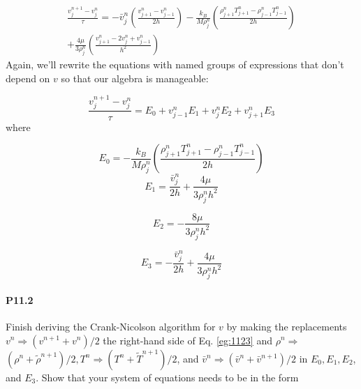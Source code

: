 \documentclass{book}
\theoremstyle{plain}
\theoremstyle{definition}
\numberwithin{exm}{chapter}
\theoremstyle{remark}
\theoremstyle{summary}
\theoremstyle{overview}
\begin{document}
\begin{equation}\label{eq:1122}
\begin{array}{r}
\frac{v_{j}^{n+1}-v_{j}^{n}}{\tau}=-\bar{v}_{j}^{n}\left(\frac{v_{j+1}^{n}-v_{j-1}^{n}}{2 h}\right)-\frac{k_{B}}{M \rho_{j}^{n}}\left(\frac{\rho_{j+1}^{n} T_{j+1}^{n}-\rho_{j-1}^{n} T_{j-1}^{n}}{2 h}\right) \\
+\frac{4 \mu}{3 \rho_{j}^{n}}\left(\frac{v_{j+1}^{n}-2 v_{j}^{n}+v_{j-1}^{n}}{h^{2}}\right)
\end{array}
\end{equation}
Again, we\rq ll rewrite the equations with named groups of expressions that don\rq t
depend on $v$ so that our algebra is manageable:


\begin{equation}\label{eq:1123}
\frac{v_{j}^{n+1}-v_{j}^{n}}{\tau}=E_{0}+v_{j-1}^{n} E_{1}+v_{j}^{n} E_{2}+v_{j+1}^{n} E_{3}
\end{equation}
where

\begin{equation}\label{eq:1124}
E_{0}=-\frac{k_{B}}{M \rho_{j}^{n}}\left(\frac{\rho_{j+1}^{n} T_{j+1}^{n}-\rho_{j-1}^{n} T_{j-1}^{n}}{2 h}\right)
\end{equation}
\begin{equation}\label{eq:1125}
E_{1}=\frac{\bar{v}_{j}^{n}}{2 h}+\frac{4 \mu}{3 \rho_{j}^{n} h^{2}}
\end{equation}

\begin{equation}\label{eq:1126}
E_{2}=-\frac{8 \mu}{3 \rho_{j}^{n} h^{2}}
\end{equation}

\begin{equation}\label{eq:1127}
E_{3}=-\frac{\bar{v}_{j}^{n}}{2 h}+\frac{4 \mu}{3 \rho_{j}^{n} h^{2}}
\end{equation}

\paragraph*{P11.2}
Finish deriving the Crank-Nicolson algorithm for $v$ by making the replacements $v^{n} \Rightarrow\left(v^{n+1}+v^{n}\right) / 2$ the right-hand side of Eq. \eqref{eg:1123} and $\rho^{n} \Rightarrow$ $\left(\rho^{n}+\tilde{\rho}^{n+1}\right) / 2, T^{n} \Rightarrow\left(T^{n}+\tilde{T}^{n+1}\right) / 2$, and $\bar{v}^{n} \Rightarrow\left(\bar{v}^{n}+\bar{v}^{n+1}\right) / 2$ in $E_{0}, E_{1}, E_{2}$, and $E_{3}$. Show that your system of equations needs to be in the form
\end{document}
